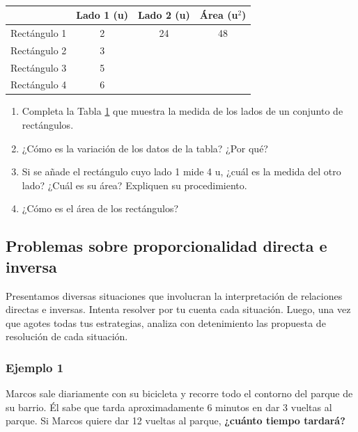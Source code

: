 \documentclass[11pt]{book}
\begin{document}
\begin{enumerate}
        \begin{table}[!h]
          \centering
          \begin{tabular}{|l|c|c|c|}
            \hline
                         & Lado 1 (u) & Lado 2 (u) & Área (u$^2$) \\
            \hline
            Rectángulo 1 & 2          & 24         & 48           \\
            Rectángulo 2 & 3          &            &              \\
            Rectángulo 3 & 5          &            &              \\
            Rectángulo 4 & 6          &            &              \\
            \hline
          \end{tabular}
          \caption{}
          \label{table:rectangulos}
        \end{table}
        \begin{enumerate}
          \item Completa la Tabla \ref{table:rectangulos} que muestra la medida de los lados de un conjunto de rect\'angulos.
          \item ¿Cómo es la variación de los datos de la tabla? ¿Por qué?
          \item Si se añade el rectángulo cuyo lado 1 mide 4 u, ¿cuál es la medida del otro lado? ¿Cuál es su área? Expliquen su procedimiento.
          \item ¿Cómo es el área de los rectángulos?
        \end{enumerate}
\end{enumerate}



\subsection{Problemas sobre proporcionalidad directa e inversa}

Presentamos diversas situaciones que involucran la interpretación de relaciones directas e inversas.
Intenta resolver por tu cuenta cada situación. Luego, una vez que agotes todas tus estrategias, analiza con detenimiento las propuesta de resolución de cada situación.

\subsubsection{Ejemplo 1}

Marcos sale diariamente con su bicicleta y recorre todo el contorno del parque de su barrio. Él sabe que tarda aproximadamente 6 minutos en dar 3 vueltas al parque.
Si Marcos quiere dar 12 vueltas al parque,
\textbf{¿cuánto tiempo tardará?}\\
\end{document}
